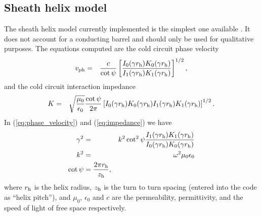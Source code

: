 \documentclass{article}
\begin{document}
\subsection{Sheath helix model}
The sheath helix model currently implemented is the simplest one
available \cite[pg.~??39--41??]{rowe:newip65}. It does not account for
a conducting barrel and should only be used for qualitative
purposes. The equations computed are the cold circuit phase velocity
\begin{eqnarray}\label{eq:phase_velocity}
  v_{\rm ph} & = & \frac{c}{\cot \psi} \left[ \frac{I_0(\gamma r_{\rm h})
      K_0(\gamma r_{\rm h})}{I_1(\gamma r_{\rm h}) K_1(\gamma r_{\rm
      h})}\right]^{1/2},
\end{eqnarray}
and the cold circuit interaction impedance
\begin{eqnarray}\label{eq:impedance}
  K & = & \sqrt\frac{\mu_0}{\epsilon_0} \frac{\cot \psi}{2 \pi}
  \left[I_0(\gamma r_{\rm h}) K_0(\gamma r_{\rm h}) I_1(\gamma r_{\rm
  h}) K_1(\gamma r_{\rm h})\right]^{1/2}.
\end{eqnarray}
In (\ref{eq:phase_velocity}) and (\ref{eq:impedance}) we have
\begin{eqnarray}
  \label{eq:gamma}
  \gamma^2 & = & k^2 \cot^2 \psi \frac{I_1(\gamma r_{\rm h})
    K_1(\gamma r_{\rm h})}{I_0(\gamma r_{\rm h}) K_0(\gamma r_{\rm h})}\\
  k^2 & = & \omega^2 \mu_0 \epsilon_0\\
  \cot \psi & = \frac{2 \pi r_{\rm h}}{z_{\rm h}},
\end{eqnarray}
where $r_{\rm h}$ is the helix radius, $z_{\rm h}$ is the turn to turn
spacing (entered into the code as ``helix pitch''), and
$\mu_0$, $\epsilon_0$ and $c$ are the permeability,
permittivity, and the speed of light of free space respectively.
\end{document}
